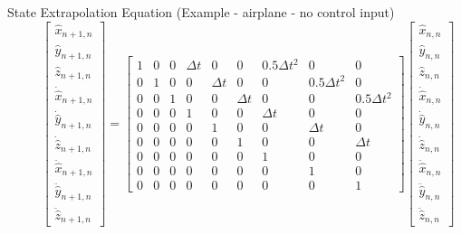 \begin{frame}{State Extrapolation Equation (Example - airplane - no control input)}
$$\quad\quad\begin{bmatrix}
\hat{x}_{n+1,n} \\
\hat{y}_{n+1,n} \\
\hat{z}_{n+1,n} \\
\dot{\hat{x}}_{n+1,n} \\
\dot{\hat{y}}_{n+1,n} \\
\dot{\hat{z}}_{n+1,n} \\
\ddot{\hat{x}}_{n+1,n} \\
\ddot{\hat{y}}_{n+1,n} \\
\ddot{\hat{z}}_{n+1,n}
\end{bmatrix}
=
\begin{bmatrix}
1 & 0 & 0 & \Delta t & 0 & 0 & 0.5\Delta t^2 & 0 & 0 \\
0 & 1 & 0 & 0 & \Delta t & 0 & 0 & 0.5\Delta t^2 & 0 \\
0 & 0 & 1 & 0 & 0 & \Delta t & 0 & 0 & 0.5\Delta t^2 \\
0 & 0 & 0 & 1 & 0 & 0 & \Delta t & 0 & 0 \\
0 & 0 & 0 & 0 & 1 & 0 & 0 & \Delta t & 0 \\
0 & 0 & 0 & 0 & 0 & 1 & 0 & 0 & \Delta t \\
0 & 0 & 0 & 0 & 0 & 0 & 1 & 0 & 0 \\
0 & 0 & 0 & 0 & 0 & 0 & 0 & 1 & 0 \\
0 & 0 & 0 & 0 & 0 & 0 & 0 & 0 & 1
\end{bmatrix}
\begin{bmatrix}
\hat{x}_{n,n} \\
\hat{y}_{n,n} \\
\hat{z}_{n,n} \\
\dot{\hat{x}}_{n,n} \\
\dot{\hat{y}}_{n,n} \\
\dot{\hat{z}}_{n,n} \\
\ddot{\hat{x}}_{n,n} \\
\ddot{\hat{y}}_{n,n} \\
\ddot{\hat{z}}_{n,n}
\end{bmatrix}$$

       
\end{frame}
